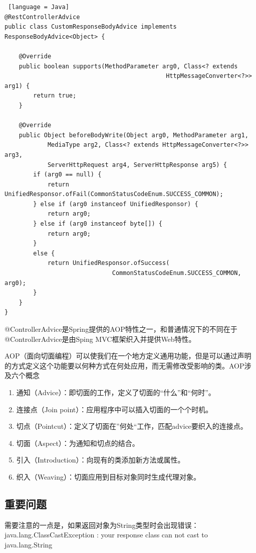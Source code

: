\begin{lstlisting} [language = Java]
@RestControllerAdvice
public class CustomResponseBodyAdvice implements ResponseBodyAdvice<Object> {

    @Override
    public boolean supports(MethodParameter arg0, Class<? extends 
                                             HttpMessageConverter<?>> arg1) {
        return true;
    }

    @Override
    public Object beforeBodyWrite(Object arg0, MethodParameter arg1, 
            MediaType arg2, Class<? extends HttpMessageConverter<?>> arg3, 
            ServerHttpRequest arg4, ServerHttpResponse arg5) {
        if (arg0 == null) {
            return UnifiedResponsor.ofFail(CommonStatusCodeEnum.SUCCESS_COMMON);
        } else if (arg0 instanceof UnifiedResponsor) {
            return arg0;
        } else if (arg0 instanceof byte[]) {
            return arg0;
        }
        else {
            return UnifiedResponsor.ofSuccess(
                              CommonStatusCodeEnum.SUCCESS_COMMON, arg0);
        }
    }
}
\end{lstlisting}

@ControllerAdvice是Spring提供的AOP特性之一，和普通情况下的不同在于@ControllerAdvice是由Sping MVC框架织入并提供Web特性。

AOP（面向切面编程）可以使我们在一个地方定义通用功能，但是可以通过声明的方式定义这个功能要以何种方式在何处应用，而无需修改受影响的类\cite{.SpringInAction}。AOP涉及六个概念
\begin{enumerate}
  \item 通知（Advice）：即切面的工作，定义了切面的“什么”和“何时”。
  \item 连接点（Join point）：应用程序中可以插入切面的一个个时机。
  \item 切点（Pointcut）：定义了切面在”何处“工作，匹配advice要织入的连接点。
  \item 切面（Aspect）：为通知和切点的结合。
  \item 引入（Introduction）：向现有的类添加新方法或属性。
  \item 织入（Weaving）：切面应用到目标对象同时生成代理对象。
\end{enumerate}

\subsection{重要问题}

需要注意的一点是，如果返回对象为String类型时会出现错误： \\java.lang.ClassCastException :  your response class can not cast to java.lang.String

